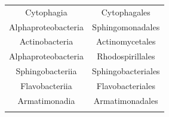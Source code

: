 \documentclass[]{article}
\begin{document}
\begin{longtable}[]{@{}cc@{}}
\begin{minipage}[t]{0.38\columnwidth}\centering\strut
Cytophagia\strut
\end{minipage} & \begin{minipage}[t]{0.38\columnwidth}\centering\strut
Cytophagales\strut
\end{minipage}\tabularnewline
\begin{minipage}[t]{0.38\columnwidth}\centering\strut
Alphaproteobacteria\strut
\end{minipage} & \begin{minipage}[t]{0.38\columnwidth}\centering\strut
Sphingomonadales\strut
\end{minipage}\tabularnewline
\begin{minipage}[t]{0.38\columnwidth}\centering\strut
Actinobacteria\strut
\end{minipage} & \begin{minipage}[t]{0.38\columnwidth}\centering\strut
Actinomycetales\strut
\end{minipage}\tabularnewline
\begin{minipage}[t]{0.38\columnwidth}\centering\strut
Alphaproteobacteria\strut
\end{minipage} & \begin{minipage}[t]{0.38\columnwidth}\centering\strut
Rhodospirillales\strut
\end{minipage}\tabularnewline
\begin{minipage}[t]{0.38\columnwidth}\centering\strut
Sphingobacteriia\strut
\end{minipage} & \begin{minipage}[t]{0.38\columnwidth}\centering\strut
Sphingobacteriales\strut
\end{minipage}\tabularnewline
\begin{minipage}[t]{0.38\columnwidth}\centering\strut
Flavobacteriia\strut
\end{minipage} & \begin{minipage}[t]{0.38\columnwidth}\centering\strut
Flavobacteriales\strut
\end{minipage}\tabularnewline
\begin{minipage}[t]{0.38\columnwidth}\centering\strut
Armatimonadia\strut
\end{minipage} & \begin{minipage}[t]{0.38\columnwidth}\centering\strut
Armatimonadales\strut
\end{minipage}\tabularnewline
\begin{minipage}[t]{0.38\columnwidth}\centering\strut

\end{minipage}
\end{longtable}
\end{document}
